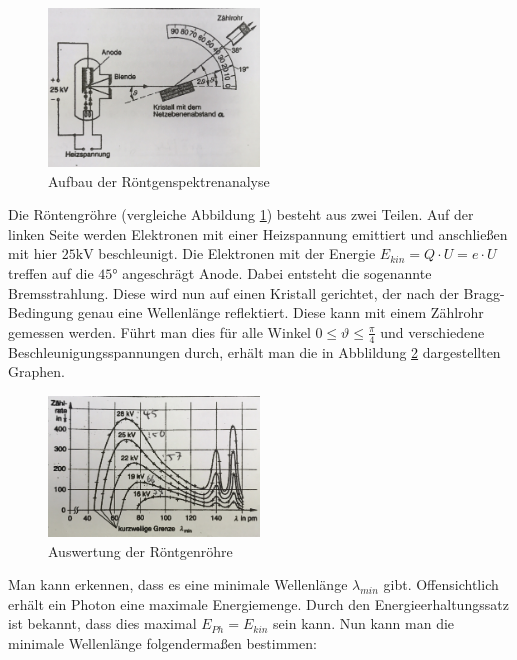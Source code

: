 \documentclass[a4paper]{article}
\begin{document}
			
				\begin{figure}[H]
					\centering
					\includegraphics[width=0.5\textwidth]{img/roentgenstrahlung_aufbau.jpg}
					\caption{Aufbau der Röntgenspektrenanalyse}
					\label{img:roentgenstrahlung_aufbau}
				\end{figure}
			\noindent Die Röntengröhre (vergleiche Abbildung \ref{img:roentgenstrahlung_aufbau}) besteht aus zwei Teilen. Auf der linken Seite werden Elektronen mit einer Heizspannung emittiert und anschließen mit hier $25\si{\kilo\volt}$ beschleunigt. Die Elektronen mit der Energie $E_{kin} = Q\cdot U = e\cdot U$ treffen auf die $45\si{\degree}$ angeschrägt Anode. Dabei entsteht die sogenannte Bremsstrahlung. Diese wird nun auf einen Kristall gerichtet, der nach der Bragg-Bedingung genau eine Wellenlänge reflektiert. Diese kann mit einem Zählrohr gemessen werden. Führt man dies für alle Winkel $0\le \vartheta \le \frac{\pi}{4}$ und verschiedene Beschleunigungsspannungen durch, erhält man die in Abblildung \ref{img:roentgenspektren_auswertung} dargestellten Graphen.
			
	
			\begin{figure}[H]
				\centering
				\includegraphics[width=0.5\textwidth]{img/roentgenspektren_auswertung.jpg}
				\caption{Auswertung der Röntgenröhre}
				\label{img:roentgenspektren_auswertung}
			\end{figure}
		
			\noindent Man kann erkennen, dass es eine minimale Wellenlänge $\lambda_{min}$ gibt. Offensichtlich erhält ein Photon eine maximale Energiemenge. Durch den Energieerhaltungssatz ist bekannt, dass dies maximal $E_{Ph} = E_{kin}$ sein kann. Nun kann man die minimale Wellenlänge folgendermaßen bestimmen:
			
\end{document}
